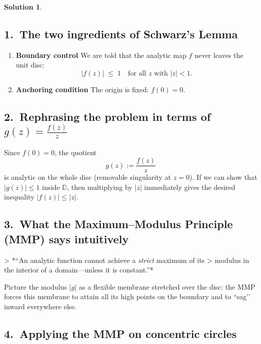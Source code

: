 \documentclass[12pt]{article}
\theoremstyle{definition} %
\newtheorem{solution}{Solution}
\theoremstyle{plain} %
\begin{document}
\begin{solution}

   \subsection*{1.\  The two ingredients of Schwarz’s Lemma}
   
   \begin{enumerate}[label=\textbf{\arabic*.},wide,labelwidth=!, labelindent=0pt]
     \item \textbf{Boundary control}  
           We are told that the analytic map $f$ never leaves the unit disc:
           \[
              |f(z)| \;\le\; 1
              \quad\text{for all } z\text{ with }|z|<1.
           \]
     \item \textbf{Anchoring condition}  
           The origin is fixed: $f(0)=0$.
   \end{enumerate}
   
   \medskip
   \subsection*{2.\  Rephrasing the problem in terms of \boldmath$g(z)=\frac{f(z)}{z}$}
   
   Since $f(0)=0$, the quotient
   \[
      g(z):=\frac{f(z)}{z}
   \]
   is analytic on the whole disc (removable singularity at $z=0$).  
   If we can show that $|g(z)|\le1$ inside $\mathbb{D}$, then multiplying by $|z|$
   immediately gives the desired inequality
   $|f(z)|\le|z|$.
   
   \medskip
   \subsection*{3.\  What the Maximum–Modulus Principle (MMP) says intuitively}
   
   > *“An analytic function cannot achieve a \emph{strict} maximum of its
   >  modulus in the interior of a domain—unless it is constant.”*
   
   Picture the modulus $|g|$ as a flexible membrane stretched over the
   disc: the MMP forces this membrane to attain all its high points on the
   boundary and to “sag’’ inward everywhere else.
   
   \medskip
   \subsection*{4.\  Applying the MMP on concentric circles}
   

\end{solution}
\end{document}
